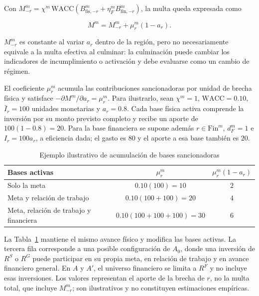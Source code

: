 Con \(M_{-r}^m=\chi^m\,\mathrm{WACC}(B_{\mathrm{fis},-r}^m+\eta_F^m B_{\mathrm{fin},-r}^m)\), la multa queda expresada como

\begin{equation}
\label{eq:exposicion_sancionadora_r}
M^m=M_{-r}^m+\mu_r^m(1-a_r).
\end{equation}

\(M_{-r}^m\) es constante al variar \(a_r\) dentro de la región, pero no necesariamente equivale a la multa efectiva al culminar: la culminación puede cambiar los indicadores de incumplimiento o activación y debe evaluarse como un cambio de régimen.

El coeficiente \(\mu_r^m\) acumula las contribuciones sancionadoras por unidad de brecha física y satisface \(-\partial M^m/\partial a_r=\mu_r^m\). Para ilustrarlo, sean \(\chi^m=1\), \(\mathrm{WACC}=0.10\), \(\bar I_r=100\) unidades monetarias y \(a_r=0.8\). Cada base física activa comprende la inversión por su monto previsto completo y recibe un aporte de \(100(1-0.8)=20\). Para la base financiera se supone además \(r\in\mathrm{Fin}^m\), \(d_F^m=1\) e \(I_r=100a_r\), a eficiencia dada; el gasto es \(80\) y el aporte a esa base también es \(20\).

\begin{table}[htbp]
\centering
\caption{Ejemplo ilustrativo de acumulación de bases sancionadoras}
\label{tab:ejemplo_exposicion_bases}
\begin{tabularx}{\linewidth}{@{}Xcc@{}}
\toprule
Bases activas & \(\mu_r^m\) & \(\mu_r^m(1-a_r)\) \\
\midrule
Solo la meta & \(0.10(100)=10\) & \(2\) \\
Meta y relación de trabajo & \(0.10(100+100)=20\) & \(4\) \\
Meta, relación de trabajo y financiera & \(0.10(100+100+100)=30\) & \(6\) \\
\bottomrule
\end{tabularx}
\end{table}

La Tabla~\ref{tab:ejemplo_exposicion_bases} mantiene el mismo avance físico y modifica las bases activas. La tercera fila corresponde a una posible configuración de \(A_0\), donde una inversión de \(R^S\) o \(R^G\) puede participar en su propia meta, en relación de trabajo y en avance financiero general. En \(A\) y \(A'\), el universo financiero se limita a \(R^F\) y no incluye esas inversiones. Los valores representan el aporte de la brecha de \(r\), no la multa total, que incluye \(M_{-r}^m\); son ilustrativos y no constituyen estimaciones empíricas.

